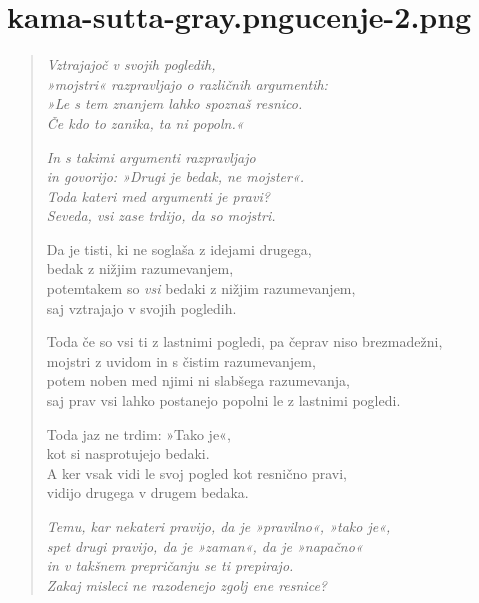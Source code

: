 
\chapter[Cūḷabyūha Sutta]{{kama-sutta-gray.png}{ucenje-2.png}}


\begin{verse}


\emph{Vztrajajoč v svojih pogledih,}\\
\emph{»mojstri« razpravljajo o različnih argumentih:}\\
\emph{»Le s tem znanjem lahko spoznaš resnico.}\\
\emph{Če kdo to zanika, ta ni popoln.«}

\emph{In s takimi argumenti razpravljajo}\\
\emph{in govorijo: »Drugi je bedak, ne mojster«.}\\
\emph{Toda kateri med argumenti je pravi?}\\
\emph{Seveda, vsi zase trdijo, da so mojstri.}

Da je tisti, ki ne soglaša z idejami drugega,\\
bedak z nižjim razumevanjem,\\
potemtakem so \emph{vsi} bedaki z nižjim razumevanjem,\\
saj vztrajajo v svojih pogledih.

Toda če so vsi ti z lastnimi pogledi, pa čeprav niso brezmadežni,\\
mojstri z uvidom in s čistim razumevanjem,\\
potem noben med njimi ni slabšega razumevanja,\\
saj prav vsi lahko postanejo popolni le z lastnimi pogledi.

Toda jaz ne trdim: »Tako je«,\\
kot si nasprotujejo bedaki.\\
A ker vsak vidi le svoj pogled kot resnično pravi,\\
vidijo drugega v drugem bedaka.

\emph{Temu, kar nekateri pravijo, da je »pravilno«, »tako je«,\\
spet drugi pravijo, da je »zaman«, da je »napačno«\\
in v takšnem prepričanju se ti prepirajo.\\
Zakaj misleci ne razodenejo zgolj ene resnice?}


\end{verse}

